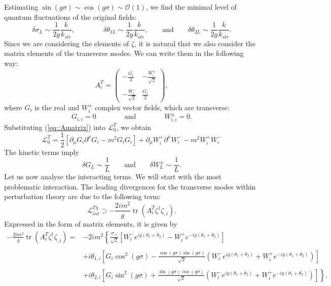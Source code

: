 \documentclass{article}
\DeclareMathOperator{\tr}{tr}
\begin{document}
Estimating $\sin(g\sigma)\sim\cos(g\sigma)\sim\mathcal{O}(1)$, we find the minimal level of quantum fluctuations of the original fields:
\begin{equation}
  \delta\sigma_L\sim\frac{1}{2g}\frac{k}{k_{str}},\qquad\qquad\delta\theta_{1L}\sim\frac{1}{2g}\frac{k}{k_{str}},\qquad\text{and}\qquad\delta\theta_{2L}\sim\frac{1}{2g}\frac{k}{k_{str}}.
\end{equation}
Since we are considering the elements of $\zeta$, it is natural that we also consider the matrix elements of the transverse modes. We can write them in the following way:
\begin{equation}\label{eq::Amatrix}
    A_i^T=\begin{pmatrix}
     -\frac{G_i}{2} & -\frac{W_i^+}{\sqrt{2}} \\\\
     -\frac{W_i^-}{\sqrt{2}} & \frac{G_i}{2} 
\end{pmatrix},
\end{equation}
where $G_i$ is the real and $W^{\pm}_i$ complex vector fields, which are transverse:
\begin{equation}
    G_{i,i}=0\qquad\qquad\text{and}\qquad\qquad W^{\pm}_{i,i}=0.
\end{equation}
Substituting (\ref{eq::Amatrix}) into $\mathcal{L}_0^T$, we obtain
\begin{equation}
    \mathcal{L}_0^T=\frac{1}{2}\left[\partial_{\mu}G_i\partial^{\mu}G_i-m^2G_iG_i\right]+\partial_{\mu}W^+_i\partial^{\mu}W^-_i-m^2W^+_iW^-_i
\end{equation}
The kinetic terms imply
\begin{equation}
    \delta G_L\sim\frac{1}{L}\qquad\text{and}\qquad \delta W_L^{\pm}\sim\frac{1}{L}.
\end{equation}
Let us now analyse the interacting terms. We will start with the most problematic interaction. The leading divergences for the transverse modes within perturbation theory are due to the following term:
\begin{equation}
    \mathcal{L}^{T\chi}_{int}\supset-\frac{2im^2}{g}\tr\left(A_i^T\zeta^{\dagger}\zeta_{,i}\right).
\end{equation}
Expressed in the form of matrix elements, it is given by
\begin{equation}
    \begin{split}
        -\frac{2im^2}{g}\tr\left(A_i^T\zeta^{\dagger}\zeta_{,i}\right)=&-2im^2\left\{\frac{\sigma_{,i}}{\sqrt{2}}\left[W_i^-e^{ig(\theta_1+\theta_2)}-W_i^+e^{-ig(\theta_1+\theta_2)}\right]\right.\\\\
        &\left.+ i\theta_{1,i}\left[G_i\cos^2(g\sigma)-\frac{\cos(g\sigma)\sin(g\sigma)}{\sqrt{2}}\left(W_i^-e^{ig(\theta_1+\theta_2)}+W_i^+e^{-ig(\theta_1+\theta_2)}\right)\right]\right.\\\\
         &\left.+ i\theta_{2,i}\left[G_i\sin^2(g\sigma)+\frac{\sin(g\sigma)\cos(g\sigma)}{\sqrt{2}}\left(W_i^-e^{ig(\theta_1+\theta_2)}+W_i^+e^{-ig(\theta_1+\theta_2)}\right)\right]\right\}.
    \end{split}
\end{equation}
\end{document}
